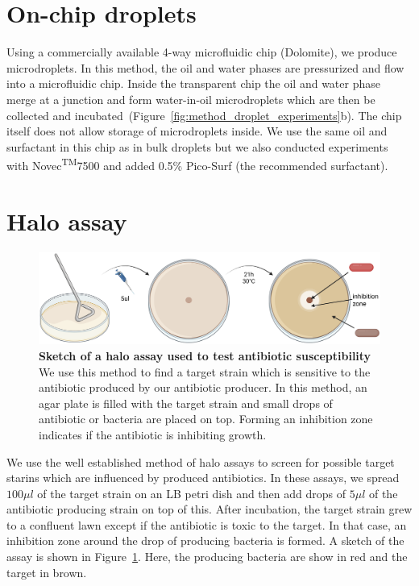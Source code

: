 \section{On-chip droplets}
Using a commercially available 4-way microfluidic chip (Dolomite), we produce microdroplets. In this method, the oil and water phases are pressurized and flow into a microfluidic chip. Inside the transparent chip the oil and water phase merge at a junction and form water-in-oil microdroplets which are then be collected and incubated~(Figure~\ref{fig:method_droplet_experiments}b). The chip itself does not allow storage of microdroplets inside. We use the same oil and surfactant in this chip as in bulk droplets but we also conducted experiments with Novec\textsuperscript{TM}7500 and added 0.5\% Pico-Surf{\textregistered} (the recommended surfactant).

\section{Halo assay}
\begin{figure}
\centering
\includegraphics[width=\linewidth]{graphics/2025_09_30_droplets_fig3.png}
\caption{\textbf{Sketch of a halo assay used to test antibiotic susceptibility} We use this method to find a target strain which is sensitive to the antibiotic produced by our antibiotic producer. In this method, an agar plate is filled with the target strain and small drops of antibiotic or bacteria are placed on top. Forming an inhibition zone indicates if the antibiotic is inhibiting growth.}
\label{fig:method_halo_assay}
\end{figure}
We use the well established method of halo assays to screen for possible target starins which are influenced by produced antibiotics. In these assays, we spread $100\mu l$ of the target strain on an LB petri dish and then add drops of $5\mu l$ of the antibiotic producing strain on top of this. After incubation, the target strain grew to a confluent lawn except if the antibiotic is toxic to the target. In that case, an inhibition zone around the drop of producing bacteria is formed. A sketch of the assay is shown in Figure~\ref{fig:method_halo_assay}. Here, the producing bacteria are show in red and the target in brown.  


